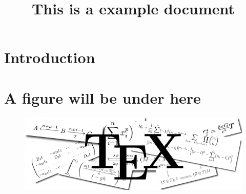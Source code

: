 \documentclass{article}
\begin{document}
\title{This is a example document}
\date{}
\maketitle 

\section{Introduction}

\lipsum[1-1]

\section{A figure will be under here}

\begin{figure}[ht]
\centering
\includegraphics[width=\linewidth]{figures/example_figure.png}
\end{figure}
\end{document}
